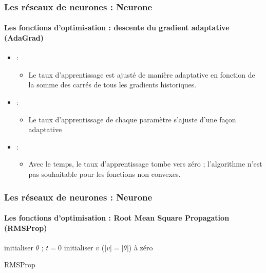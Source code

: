 \documentclass[xcolor=table]{beamer}
\begin{document}
\begin{frame}
\frametitle{Les réseaux de neurones : Neurone}
\framesubtitle{Les fonctions d'optimisation : descente du gradient adaptative (AdaGrad)}

\begin{itemize}
	\item {} : 
	\begin{itemize}
		\item Le taux d'apprentissage est ajusté de manière adaptative en fonction de la somme des carrés de tous les gradients historiques.
	\end{itemize}
	\item {} : 
	\begin{itemize}
		\item Le taux d'apprentissage de chaque paramètre s'ajuste d'une façon adaptative
	\end{itemize}
	\item {} : 
	\begin{itemize}
		\item Avec le temps, le taux d'apprentissage tombe vers zéro ; l'algorithme n'est pas souhaitable pour les fonctions non convexes.
	\end{itemize}
\end{itemize}

\end{frame}

\begin{frame}
\frametitle{Les réseaux de neurones : Neurone}
\framesubtitle{Les fonctions d'optimisation : Root Mean Square Propagation (RMSProp)}

\begin{algorithm}[H]
	\KwResult{$ \theta $}
	initialiser $ \theta $ ; $ t = 0 $\;
	initialiser $v$ ($|v| = |\theta|$) à zéro\;
	\caption{RMSProp}
\end{algorithm}

\end{frame}
\end{document}
